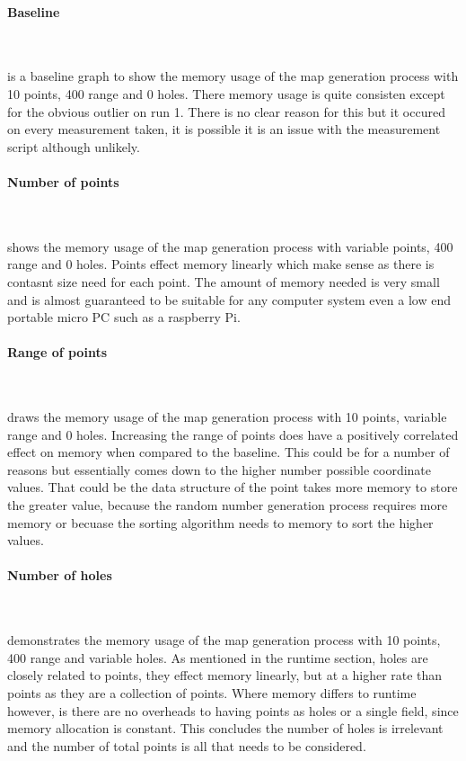 \documentclass[final]{cmpreport_02}
\begin{document}
\paragraph{Baseline} \

 is a baseline graph to show the memory usage of the map generation process with 10 points, 400 range and 0 holes.
There memory usage is quite consisten except for the obvious outlier on run 1.
There is no clear reason for this but it occured on every measurement taken, it is possible it is an issue with the measurement script although unlikely.


\paragraph{Number of points} \

 shows the memory usage of the map generation process with variable points, 400 range and 0 holes.
Points effect memory linearly which make sense as there is contasnt size need for each point.
The amount of memory needed is very small and is almost guaranteed to be suitable for any computer system even a low end portable micro PC such as a raspberry Pi.


\paragraph{Range of points} \

 draws the memory usage of the map generation process with 10 points, variable range and 0 holes.
Increasing the range of points does have a positively correlated effect on memory when compared to the baseline.
This could be for a number of reasons but essentially comes down to the higher number possible coordinate values.
That could be the data structure of the point takes more memory to store the greater value, because the random number generation process requires more memory or becuase the sorting algorithm needs to memory to sort the higher values.

\paragraph{Number of holes} \

 demonstrates the memory usage of the map generation process with 10 points, 400 range and variable holes.
As mentioned in the runtime section, holes are closely related to points, they effect memory linearly, but at a higher rate than points as they are a collection of points.
Where memory differs to runtime however, is there are no overheads to having points as holes or a single field, since memory allocation is constant.
This concludes the number of holes is irrelevant and the number of total points is all that needs to be considered.
\end{document}
